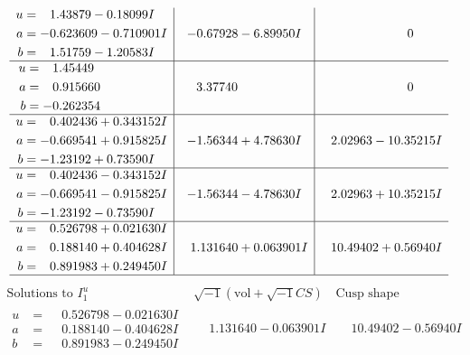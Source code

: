 \documentclass[1p]{elsarticle_modified}
\theoremstyle{definition}
\newcommand{\I}{\sqrt{-1}}
\begin{document}
$$\begin{array}{c|c|c}
\begin{aligned}
u &= \phantom{-}1.43879 - 0.18099 I \\
a &= -0.623609 - 0.710901 I \\
b &= \phantom{-}1.51759 - 1.20583 I\end{aligned}
 & -0.67928 - 6.89950 I & \phantom{-0.000000 } 0 \\ \hline\begin{aligned}
u &= \phantom{-}1.45449\phantom{ +0.000000I} \\
a &= \phantom{-}0.915660\phantom{ +0.000000I} \\
b &= -0.262354\phantom{ +0.000000I}\end{aligned}
 & \phantom{-}3.37740\phantom{ +0.000000I} & \phantom{-0.000000 } 0 \\ \hline\begin{aligned}
u &= \phantom{-}0.402436 + 0.343152 I \\
a &= -0.669541 + 0.915825 I \\
b &= -1.23192 + 0.73590 I\end{aligned}
 & -1.56344 + 4.78630 I & \phantom{-}2.02963 - 10.35215 I \\ \hline\begin{aligned}
u &= \phantom{-}0.402436 - 0.343152 I \\
a &= -0.669541 - 0.915825 I \\
b &= -1.23192 - 0.73590 I\end{aligned}
 & -1.56344 - 4.78630 I & \phantom{-}2.02963 + 10.35215 I \\ \hline\begin{aligned}
u &= \phantom{-}0.526798 + 0.021630 I \\
a &= \phantom{-}0.188140 + 0.404628 I \\
b &= \phantom{-}0.891983 + 0.249450 I\end{aligned}
 & \phantom{-}1.131640 + 0.063901 I & \phantom{-}10.49402 + 0.56940 I\\
 \hline 
 \end{array}$$\newpage$$\begin{array}{c|c|c}  
\text{Solutions to }I^u_{1}& \I (\text{vol} + \sqrt{-1}CS) & \text{Cusp shape}\\
 \hline 
\begin{aligned}
u &= \phantom{-}0.526798 - 0.021630 I \\
a &= \phantom{-}0.188140 - 0.404628 I \\
b &= \phantom{-}0.891983 - 0.249450 I\end{aligned}
 & \phantom{-}1.131640 - 0.063901 I & \phantom{-}10.49402 - 0.56940 I \\ \hline\begin{aligned}

\end{aligned}
\end{array}$$
\end{document}
